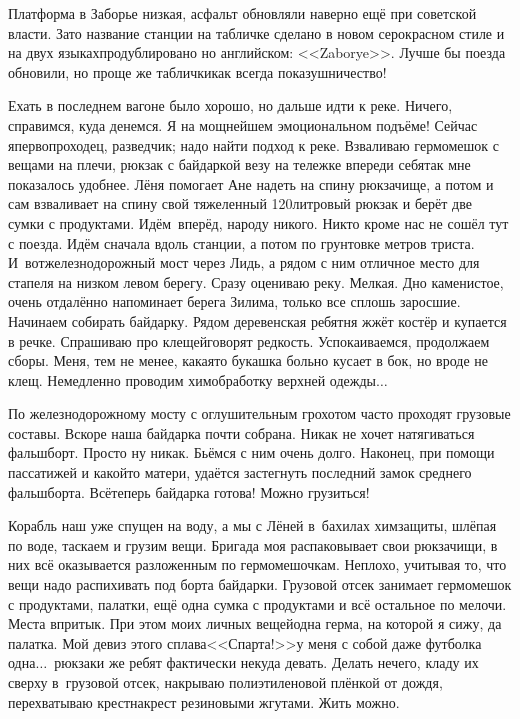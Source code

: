 Платформа в Заборье низкая, асфальт обновляли наверно ещё при советской власти. Зато название станции на табличке сделано в новом серо\sdash красном стиле и на двух языках\mdash продублировано но английском: <<Zaborye>>. Лучше бы поезда обновили, но проще же таблички\mdash как всегда показушничество! 

Ехать в последнем вагоне было хорошо, но дальше идти к реке. Ничего, справимся, куда денемся. Я на мощнейшем эмоциональном подъёме! Сейчас я\mdash первопроходец, разведчик; надо найти подход к реке.  Взваливаю гермомешок с вещами на плечи, рюкзак с байдаркой везу на тележке впереди себя\mdash так мне показалось удобнее. Лёня помогает Ане надеть на спину рюкзачище, а потом и сам взваливает на спину свой тяжеленный 120\sdash литровый рюкзак и берёт две сумки с продуктами. Идём~вперёд, народу никого. Никто кроме нас не сошёл тут с поезда. Идём сначала вдоль станции, а потом по грунтовке метров триста. И~вот\mdash железнодорожный мост через Лидь, а рядом с ним отличное место для стапеля на низком левом берегу. 
\newpage
Сразу оцениваю реку. Мелкая. Дно каменистое, очень отдалённо напоминает берега Зилима, только все сплошь заросшие. Начинаем собирать байдарку. Рядом деревенская ребятня жжёт костёр и купается в речке. Спрашиваю про клещей\mdash говорят редкость. Успокаиваемся, продолжаем сборы. Меня, тем не менее, какая\sdash то букашка больно кусает в бок, но вроде не клещ. Немедленно проводим химобработку верхней одежды$\ldots$

По железнодорожному мосту с оглушительным грохотом часто проходят грузовые составы. Вскоре наша байдарка почти собрана. Никак не хочет натягиваться фальшборт. Просто ну никак. Бьёмся с ним очень долго. Наконец, при помощи пассатижей и какой\sdash то матери, удаётся застегнуть последний замок среднего фальшборта. Всё\mdash теперь байдарка готова! Можно грузиться! 

Корабль наш уже спущен на воду, а мы с Лёней в~бахилах химзащиты, шлёпая по воде, таскаем и грузим вещи. Бригада моя распаковывает свои рюкзачищи, в них всё оказывается разложенным по гермомешочкам. Неплохо, учитывая то, что вещи надо распихивать под борта байдарки. Грузовой отсек занимает гермомешок с продуктами, палатки, ещё одна сумка с продуктами и всё остальное по мелочи. Места впритык. При этом моих личных вещей\mdash одна герма, на которой я сижу, да палатка. Мой девиз этого сплава\mdash <<Спарта!>>\mdash у меня с собой даже футболка одна$\ldots$~рюкзаки же ребят фактически некуда девать. Делать нечего, кладу их сверху в~грузовой отсек, накрываю полиэтиленовой плёнкой от дождя, перехватываю крест\sdash накрест резиновыми жгутами. Жить можно. 

